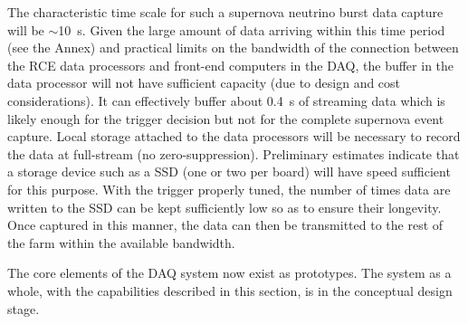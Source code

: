 The characteristic time scale for such a supernova neutrino burst data
capture will be $\sim$\SI{10}{\second}.  Given the large amount of
data arriving within this time period (see the Annex) and practical
limits on the bandwidth of the connection between the RCE data
processors and front-end computers in the DAQ, 
the buffer in the data processor will not have
sufficient capacity (due to design and cost considerations). It can
effectively buffer about \SI{0.4}{\second} of streaming data which is
likely enough for the trigger decision but not for the complete
supernova event capture.  Local storage attached to the
data processors will be necessary to record the data at full-stream
(no zero-suppression).  Preliminary estimates indicate that a
storage device such as a SSD (one or two per board) will have speed
sufficient for this purpose.  With the trigger properly tuned, the number
of times data are written to the SSD can be kept sufficiently low so
as to ensure their longevity.  Once captured in this manner, the data
can then be transmitted to the rest of the farm within the available
bandwidth.

The core elements of the DAQ system now exist as prototypes.  The
system as a whole, with the capabilities described in this section, is in the
conceptual design stage. %





